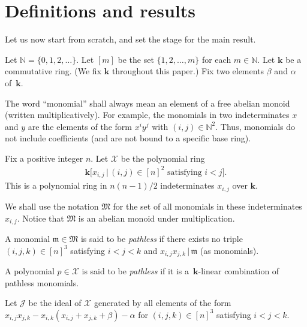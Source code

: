 \documentclass[pdftex]{sigma}
\numberwithin{equation}{section}
\begin{document}
\section{Definitions and results}\label{sect.states}

Let us now start from scratch, and set the stage for the main result.

\begin{Definition}Let $\mathbb{N}=\{ 0,1,2,\ldots\} $. Let $[m] $ be the set $\{ 1,2,\ldots,m\} $ for each $m\in\mathbb{N}$. Let $\mathbf{k}$ be a commutative ring. (We fix $\mathbf{k}$ throughout this paper.) Fix two elements $\beta$ and $\alpha$ of~$\mathbf{k}$.

The word ``monomial'' shall always mean an element of a free abelian monoid (written multiplicatively). For example, the monomials in two indeterminates $x$ and $y$ are the elements of the form $x^{i}y^{j}$ with $(i,j) \in\mathbb{N}^{2}$. Thus, monomials do not include coefficients (and are not bound to a specific base ring).
\end{Definition}

\begin{Definition}Fix a positive integer $n$. Let $\mathcal{X}$ be the polynomial ring
\begin{gather*}
\mathbf{k}\big[ x_{i,j}\,|\, (i,j) \in[n] ^{2}\text{ satisfying }i<j\big] .
\end{gather*}
This is a polynomial ring in $n(n-1) /2$ indeterminates $x_{i,j}$ over $\mathbf{k}$.

We shall use the notation $\mathfrak{M}$ for the set of all monomials in these indeterminates $x_{i,j}$. Notice that $\mathfrak{M}$ is an abelian monoid under multiplication.
\end{Definition}

\begin{Definition} A monomial $\mathfrak{m}\in\mathfrak{M}$ is said to be \textit{pathless} if there exists no triple $(i,j,k) \in[n] ^{3}$ satisfying $i<j<k$ and $x_{i,j}x_{j,k}\,|\,\mathfrak{m}$ (as monomials).

A polynomial $p\in\mathcal{X}$ is said to be \textit{pathless} if it is a~$\mathbf{k}$-linear combination of pathless monomials.
\end{Definition}

\begin{Definition} Let $\mathcal{J}$ be the ideal of $\mathcal{X}$ generated by all elements of the form $x_{i,j}x_{j,k}-x_{i,k} ( x_{i,j}+x_{j,k}+\beta ) -\alpha$ for $(i,j,k) \in[n] ^{3}$ satisfying $i<j<k$.
\end{Definition}
\end{document}

